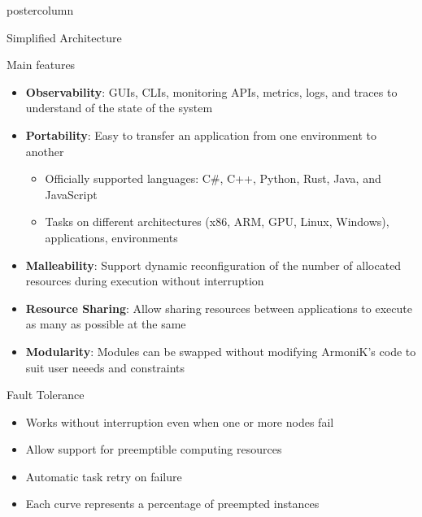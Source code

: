 \begin{frame}[fragile]
\begin{columns}[T]
\begin{column}{.49\textwidth}
\begin{beamercolorbox}[center,wd=\textwidth]{postercolumn}
\begin{minipage}[T]{.96\textwidth}
            \begin{block}{Simplified Architecture}
            \centering
            
            \end{block}

            \begin{block}{Main features}
                \begin{itemize}
                \item \textbf{Observability}: GUIs, CLIs, monitoring APIs, metrics, logs, and traces to understand of the state of the system
                \item \textbf{Portability}: Easy to transfer an application from one environment to another
                \begin{itemize}
                    \item Officially supported languages: C\#, C++, Python, Rust, Java, and JavaScript
                    \item Tasks on different architectures (x86, ARM, GPU, Linux, Windows), applications, environments
                \end{itemize}
                \item \textbf{Malleability}: Support dynamic reconfiguration of the number of allocated resources during execution without interruption
                \item \textbf{Resource Sharing}: Allow sharing resources between applications to execute as many as possible at the same
                \item \textbf{Modularity}: Modules can be swapped without modifying ArmoniK's code to suit user neeeds and constraints
                \end{itemize}
            \end{block}

            \begin{block}{Fault Tolerance}
              \begin{itemize}
              \item Works without interruption even when one or more nodes fail
              \item Allow support for preemptible computing resources
              \item Automatic task retry on failure
              \item Each curve represents a percentage of preempted instances
              \end{itemize}
              \begin{figure}
                \centering
                
              \end{figure}
            \end{block}


\end{minipage}
\end{beamercolorbox}
\end{column}
\end{columns}
\end{frame}
